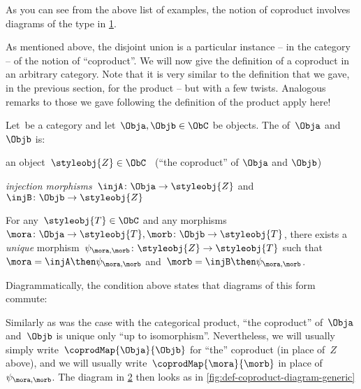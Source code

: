 As you can see from the above list of examples, the notion of coproduct involves diagrams of the type in \cref{fig:coprod_generic}.

  \begin{figure}[h!]
  \begin{center}
  \end{center}
  \caption{}
    \label{fig:coprod_generic}
  \end{figure}


As mentioned above, the disjoint union is a particular instance -- in the category \Set  -- of the notion of ``coproduct''.
We will now give the definition of a coproduct in an arbitrary category. Note that it is very similar to the definition that we gave, in the previous section, for the product -- but with a few twists. Analogous remarks to those we gave following the definition of the product apply here!

\begin{ctdefinition}[Coproduct]
  \label{def:catcoproduct}
  Let~\CatC be a category and let~$\Obja, \Objb \in \ObC$ be objects. The \emph{} of~$\Obja$ and~$\Objb$ is:  \\
  \constit
  \begin{compactenum}
    \item an object~$\styleobj{Z} \in \ObC$ \ (``the coproduct'' of $\Obja$ and $\Objb$)
    \item \emph{injection morphisms}~$\injA \colon \Obja \to \styleobj{Z} $ and~$\injB \colon \Objb \to \styleobj{Z} $
  \end{compactenum}
  \condit
  \begin{compactenum}
    \item For any~$\styleobj{T} \in \ObC$ and any morphisms $\mora \colon  \Obja \to \styleobj{T}, \morb \colon \Objb \to \styleobj{T}$, there exists a \emph{unique} morphism~$\psi_{\mora, \morb} \colon \styleobj{Z} \to \styleobj{T}$ such that~$\mora = \injA\then \psi_{\mora, \morb}$ and~$\morb = \injB \then \psi_{\mora,\morb}$.
  \end{compactenum}
\end{ctdefinition}


\begin{remark}
  Diagrammatically, the condition above states that diagrams of this form commute:
  \begin{figure}[h!]
  \begin{center}
  \end{center}
    \caption{\label{fig:coprod_general_1}}
\end{figure}
  \label{fig:def-coproduct-diagram}
  Similarly as was the case with the categorical product, ``the coproduct'' of~$\Obja$ and~$\Objb$ is unique only ``up to isomorphism''.
  Nevertheless, we will usually simply write~$\coprodMap{\Obja}{\Objb}$ for ``the'' coproduct (in place of~$Z$ above), and we will usually write~$\coprodMap{\mora}{\morb}$ in place of~$\psi_{\mora, \morb}$.
  The diagram in \cref{fig:coprod_general_1} then looks as in \cref{fig:def-coproduct-diagram-generic}
\end{remark}

